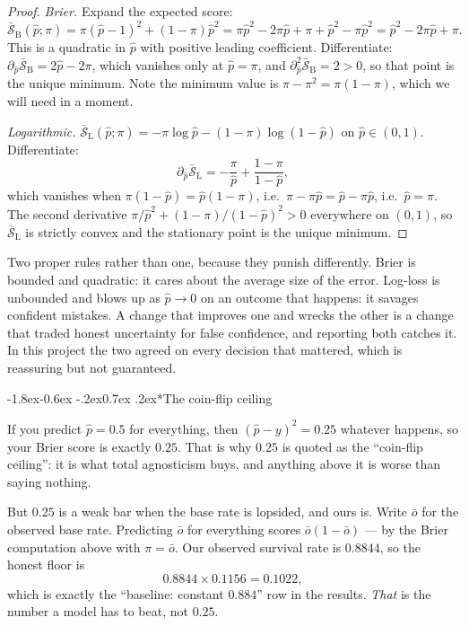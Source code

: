 \documentclass[10pt,a4paper]{article}
\makeatletter
\theoremstyle{plain}
\theoremstyle{definition}
\theoremstyle{remark}
\renewcommand\subsubsection{\@startsection{subsubsection}{3}{\z@}%
  {-1.8ex\@plus -0.6ex \@minus -.2ex}{0.7ex \@plus .2ex}{\normalfont\normalsize\bfseries}}
\makeatother
\begin{document}
\begin{proof}
\emph{Brier.} Expand the expected score:
\[
\bar{\mathcal{S}}_{\mathrm{B}}(\hat p;\pi) = \pi(\hat p-1)^2 + (1-\pi)\hat p^2
 = \pi \hat p^2 - 2\pi \hat p + \pi + \hat p^2 - \pi \hat p^2
 = \hat p^2 - 2\pi \hat p + \pi .
\]
This is a quadratic in $\hat p$ with positive leading coefficient. Differentiate:
$\partial_{\hat p} \bar{\mathcal{S}}_{\mathrm{B}} = 2\hat p - 2\pi$, which vanishes only
at $\hat p = \pi$, and $\partial^2_{\hat p} \bar{\mathcal{S}}_{\mathrm{B}} = 2 > 0$, so
that point is the unique minimum. Note the minimum value is $\pi - \pi^2 = \pi(1-\pi)$,
which we will need in a moment.

\emph{Logarithmic.}
$\bar{\mathcal{S}}_{\mathrm{L}}(\hat p;\pi) = -\pi\log \hat p - (1-\pi)\log(1-\hat p)$ on
$\hat p \in (0,1)$. Differentiate:
\[
\partial_{\hat p} \bar{\mathcal{S}}_{\mathrm{L}} = -\frac{\pi}{\hat p} + \frac{1-\pi}{1-\hat p},
\]
which vanishes when $\pi(1-\hat p) = \hat p(1-\pi)$, i.e.\ $\pi - \pi \hat p = \hat p -
\pi \hat p$, i.e.\ $\hat p = \pi$. The second derivative
$\pi/\hat p^2 + (1-\pi)/(1-\hat p)^2 > 0$ everywhere on $(0,1)$, so
$\bar{\mathcal{S}}_{\mathrm{L}}$ is strictly convex and the stationary point is the unique
minimum.
\end{proof}

Two proper rules rather than one, because they punish differently. Brier is bounded and
quadratic: it cares about the average size of the error. Log-loss is unbounded and blows
up as $\hat p \to 0$ on an outcome that happens: it savages confident mistakes. A change that
improves one and wrecks the other is a change that traded honest uncertainty for
false confidence, and reporting both catches it. In this project the two agreed on every
decision that mattered, which is reassuring but not guaranteed.

\subsubsection*{The coin-flip ceiling}

If you predict $\hat p = 0.5$ for everything, then $(\hat p-y)^2 = 0.25$ whatever happens,
so your Brier score is exactly $0.25$. That is why $0.25$ is quoted as the ``coin-flip
ceiling'': it is what total agnosticism buys, and anything above it is worse than saying
nothing.

But $0.25$ is a weak bar when the base rate is lopsided, and ours is. Write $\bar o$ for
the observed base rate. Predicting $\bar o$ for everything scores $\bar o(1-\bar o)$ ---
by the Brier computation above with $\pi = \bar o$. Our observed survival rate is
$0.8844$, so the honest floor is
\[
0.8844 \times 0.1156 = 0.1022,
\]
which is exactly the ``baseline: constant $0.884$'' row in the results. \emph{That} is
the number a model has to beat, not $0.25$.
\end{document}
